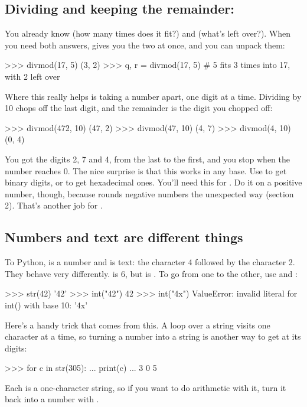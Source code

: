 \documentclass[10pt,a4paper]{article}
\begin{document}
\subsection{Dividing and keeping the remainder: }
You already know \code{/\allowbreak{}/\allowbreak{}} (how many times does it fit?) and \code{\%} (what’s left over?). When you need both answers,  gives you the two at once, and you can unpack them:
\begin{txtcode}
>>> divmod(17, 5)
(3, 2)
>>> q, r = divmod(17, 5)      # 5 fits 3 times into 17, with 2 left over
\end{txtcode}
Where this really helps is taking a number apart, one digit at a time. Dividing by 10 chops off the last digit, and the remainder is the digit you chopped off:
\begin{txtcode}
>>> divmod(472, 10)
(47, 2)
>>> divmod(47, 10)
(4, 7)
>>> divmod(4, 10)
(0, 4)
\end{txtcode}
You got the digits 2, 7 and 4, from the last to the first, and you stop when the number reaches 0. The nice surprise is that this works in any base. Use  to get binary digits, or  to get hexadecimal ones. You’ll need this for . Do it on a positive number, though, because \code{/\allowbreak{}/\allowbreak{}} rounds negative numbers the unexpected way (section 2). That’s another job for .
\subsection{Numbers and text are different things}
To Python,  is a number and \code{\textquotedbl{}42\textquotedbl{}} is text: the character 4 followed by the character 2. They behave very differently.  is 6, but \code{\textquotedbl{}4\textquotedbl{}\ +\ \textquotedbl{}2\textquotedbl{}} is \code{\textquotedbl{}42\textquotedbl{}}. To go from one to the other, use  and :
\begin{txtcode}
>>> str(42)
'42'
>>> int("42")
42
>>> int("4x")
ValueError: invalid literal for int() with base 10: '4x'
\end{txtcode}
Here’s a handy trick that comes from this. A  loop over a string visits one character at a time, so turning a number into a string is another way to get at its digits:
\begin{txtcode}
>>> for c in str(305):
...     print(c)
...
3
0
5
\end{txtcode}
Each  is a one-character string, so if you want to do arithmetic with it, turn it back into a number with .
\end{document}
